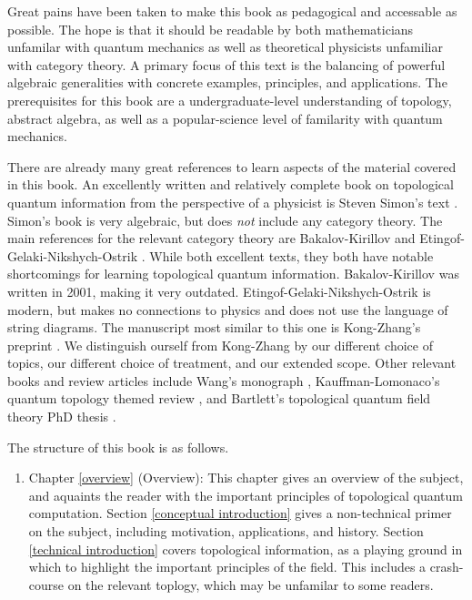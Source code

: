 \documentclass{article}
\theoremstyle{definition}
\numberwithin{figure}{section}
\begin{document}
Great pains have been taken to make this book as pedagogical and accessable as possible. The hope is that it should be readable by both mathematicians unfamilar with quantum mechanics as well as theoretical physicists unfamiliar with category theory. A primary focus of this text is the balancing of powerful algebraic generalities with concrete examples, principles, and applications. The prerequisites for this book are a undergraduate-level understanding of topology, abstract algebra, as well as a popular-science level of familarity with quantum mechanics.

There are already many great references to learn aspects of the material covered in this book. An excellently written and relatively complete book on topological quantum information from the perspective of a physicist is Steven Simon's text \cite{simon2023topological}. Simon's book is very algebraic, but does \textit{not} include any category theory. The main references for the relevant category theory are Bakalov-Kirillov \cite{bakalov2001lectures} and Etingof-Gelaki-Nikshych-Ostrik \cite{etingof2016tensor}. While both excellent texts, they both have notable shortcomings for learning topological quantum information. Bakalov-Kirillov was written in 2001, making it very outdated. Etingof-Gelaki-Nikshych-Ostrik is modern, but makes no connections to physics and does not use the language of string diagrams. The manuscript most similar to this one is Kong-Zhang's preprint \cite{kong2022invitation}. We distinguish ourself from Kong-Zhang by our different choice of topics, our different choice of treatment, and our extended scope. Other relevant books and review articles include Wang's monograph \cite{wang2010topological}, Kauffman-Lomonaco's quantum topology themed review \cite{kauffman2009topological}, and Bartlett's topological quantum field theory PhD thesis \cite{bartlett2005categorical}.

The structure of this book is as follows.

\begin{enumerate}
\item Chapter \ref{overview} (Overview): This chapter gives an overview of the subject, and aquaints the reader with the important principles of topological quantum computation. Section \ref{conceptual introduction} gives a non-technical primer on the subject, including motivation, applications, and history. Section \ref{technical introduction} covers topological  information, as a playing ground in which to highlight the important principles of the field. This includes a crash-course on the relevant toplogy, which may be unfamilar to some readers.

\end{enumerate}
\end{document}
